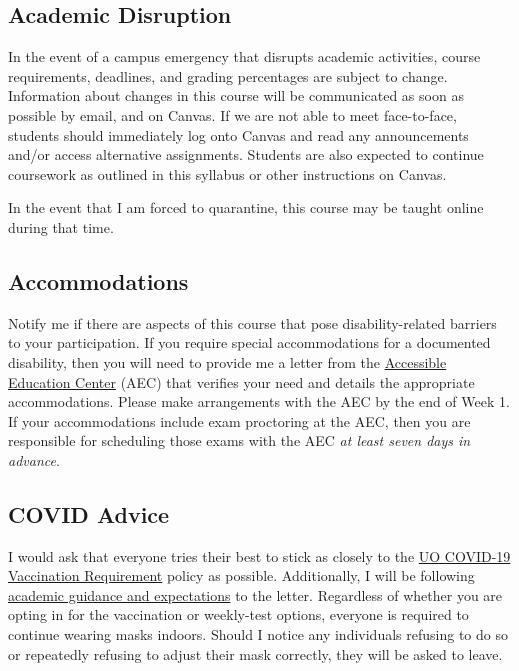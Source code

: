 \documentclass[10pt]{article}
\begin{document}
\subsection*{Academic Disruption}

In the event of a campus emergency that disrupts academic activities, course requirements, deadlines, and grading percentages are subject to change. 
Information about changes in this course will be communicated as soon as possible by email, and on Canvas. 
If we are not able to meet face-to-face, students should immediately log onto Canvas and read any announcements and/or access alternative assignments. 
Students are also expected to continue coursework as outlined in this syllabus or other instructions on Canvas.

\bigskip

\noindent In the event that I am forced to quarantine, this course may be taught online during that time.

\subsection*{Accommodations} 

Notify me if there are aspects of this course that pose disability-related barriers to your participation. If you require special accommodations for a documented disability, then you will need to provide me a letter from the \href{https://aec.uoregon.edu/}{Accessible Education Center} (AEC) that verifies your need and details the appropriate accommodations. Please make arrangements with the AEC by the end of Week 1. If your accommodations include exam proctoring at the AEC, then you are responsible for scheduling those exams with the AEC \textit{at least seven days in advance}.

\subsection*{COVID Advice} 

I would ask that everyone tries their best to stick as closely to the \href{https://coronavirus.uoregon.edu/vaccine}{UO COVID-19 Vaccination Requirement} policy as possible. 
Additionally, I will be following \href{https://provost.uoregon.edu/academic-council-fall-2021-guidance-and-expectations-during-covid-19-pandemic}{academic guidance and expectations} to the letter. 
Regardless of whether you are opting in for the vaccination or weekly-test options, everyone is required to continue wearing masks indoors. 
Should I notice any individuals refusing to do so or repeatedly refusing to adjust their mask correctly, they will be asked to leave. 
\end{document}

